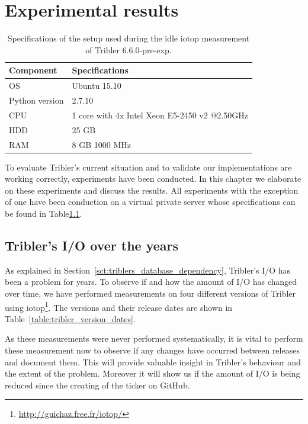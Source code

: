 \chapter{Experimental results}
\label{cpt:experiments}

\begin{table}[h]
	\centering
	\caption{Specifications of the setup used during the idle iotop measurement of Tribler 6.6.0-pre-exp.}
	\label{table:virtual_machine_specs}
	\begin{tabular}{l|l}
		\textbf{Component} 	& \textbf{Specifications} \\ \hline
		OS   				& Ubuntu 15.10 \\
		Python version		& 2.7.10 \\
		CPU					& 1 core with 4x Intel Xeon E5-2450 v2 @2.50GHz \\ 
		HDD					& 25 GB  \\ 
		RAM					& 8 GB 1000 MHz  \\
	\end{tabular}
\end{table}

To evaluate Tribler's current situation and to validate our implementations are working correctly, experiments have been conducted.
In this chapter we elaborate on these experiments and discuss the results. 
All experiments with the exception of one have been conduction on a virtual private server whose specifications can be found in Table\ref{table:virtual_machine_specs}.

\section{Tribler's I/O over the years}
As explained in Section~\ref{sct:triblers_database_dependency}, Tribler's I/O has been a problem for years.
To observe if and how the amount of I/O has changed over time, we have performed measurements on four different versions of Tribler using iotop\footnote{\url{http://guichaz.free.fr/iotop/}}.
The versions and their release dates are shown in Table~\ref{table:tribler_version_dates}.

As these measurements were never performed systematically, it is vital to perform these measurement now to observe if any changes have occurred between releases and document them.
This will provide valuable insight in Tribler's behaviour and the extent of the problem.
Moreover it will show us if the amount of I/O is being reduced since the creating of the ticker on GitHub.

